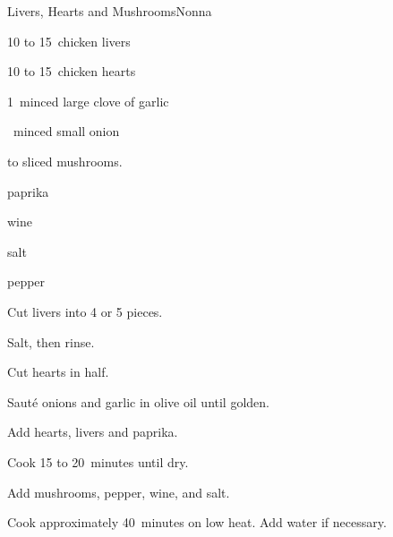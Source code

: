 \begin{recipe}{Livers, Hearts and Mushrooms}{Nonna}{}

\begin{ingredients}
\item 10 to 15~chicken livers
\item 10 to 15~chicken hearts
\item 1~minced large clove of garlic
\item \half{}~minced small onion
\item \threequarter{} to  sliced mushrooms.
\item \tp{\half} paprika
\item wine
\item salt
\item pepper
\end{ingredients}

\begin{directions}
\item Cut livers into 4 or 5 pieces.
\item Salt, then rinse.
\item Cut hearts in half.
\item Saut\'e onions and garlic in olive oil until golden.
\item Add hearts, livers and paprika.
\item Cook 15 to 20~minutes until dry.
\item Add mushrooms, pepper, wine, and salt.
\item Cook approximately 40~minutes on low heat. Add water if necessary.
\end{directions}

\end{recipe}
